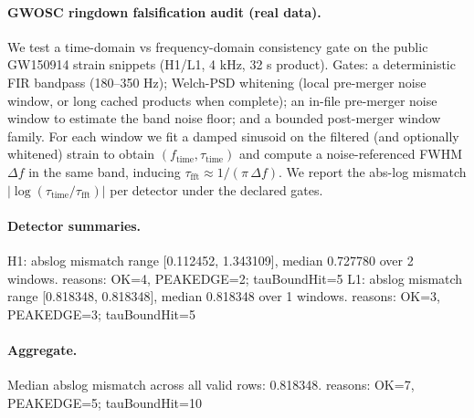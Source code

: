\paragraph{GWOSC ringdown falsification audit (real data).} \AuditTag We test a time-domain vs frequency-domain consistency gate on the public GW150914 strain snippets (H1/L1, 4 kHz, 32 s product). Gates: a deterministic FIR bandpass (180--350 Hz); Welch-PSD whitening (local pre-merger noise window, or long cached products when complete); an in-file pre-merger noise window to estimate the band noise floor; and a bounded post-merger window family. For each window we fit a damped sinusoid on the filtered (and optionally whitened) strain to obtain $(f_{\mathrm{time}},\tau_{\mathrm{time}})$ and compute a noise-referenced FWHM $\Delta f$ in the same band, inducing $\tau_{\mathrm{fft}}\approx 1/(\pi\,\Delta f)$. We report the abs-log mismatch $|\log(\tau_{\mathrm{time}}/\tau_{\mathrm{fft}})|$ per detector under the declared gates.
\paragraph{Detector summaries.} \AuditTag H1: abslog mismatch range [0.112452, 1.343109], median 0.727780 over 2 windows. reasons: OK=4, PEAKEDGE=2; tauBoundHit=5 L1: abslog mismatch range [0.818348, 0.818348], median 0.818348 over 1 windows. reasons: OK=3, PEAKEDGE=3; tauBoundHit=5
\paragraph{Aggregate.} \AuditTag Median abslog mismatch across all valid rows: 0.818348. reasons: OK=7, PEAKEDGE=5; tauBoundHit=10